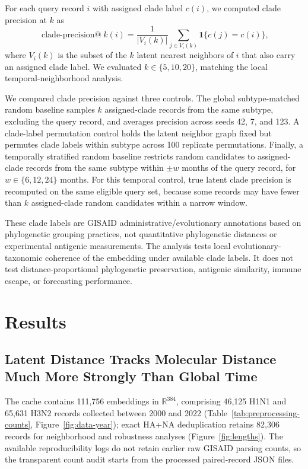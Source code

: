 \documentclass[11pt]{article}
\newcommand{\R}{\mathbb{R}}
\begin{document}
For each query record $i$ with assigned clade label $c(i)$, we computed clade precision at $k$ as
\[
\operatorname{clade\text{-}precision@}k(i)=
\frac{1}{|V_i(k)|}\sum_{j\in V_i(k)}\mathbf{1}\{c(j)=c(i)\},
\]
where $V_i(k)$ is the subset of the $k$ latent nearest neighbors of $i$ that also carry an assigned clade label. We evaluated $k\in\{5,10,20\}$, matching the local temporal-neighborhood analysis.

We compared clade precision against three controls. The global subtype-matched random baseline samples $k$ assigned-clade records from the same subtype, excluding the query record, and averages precision across seeds 42, 7, and 123. A clade-label permutation control holds the latent neighbor graph fixed but permutes clade labels within subtype across 100 replicate permutations. Finally, a temporally stratified random baseline restricts random candidates to assigned-clade records from the same subtype within $\pm w$ months of the query record, for $w\in\{6,12,24\}$ months. For this temporal control, true latent clade precision is recomputed on the same eligible query set, because some records may have fewer than $k$ assigned-clade random candidates within a narrow window.

These clade labels are GISAID administrative/evolutionary annotations based on phylogenetic grouping practices, not quantitative phylogenetic distances or experimental antigenic measurements. The analysis tests local evolutionary-taxonomic coherence of the embedding under available clade labels. It does not test distance-proportional phylogenetic preservation, antigenic similarity, immune escape, or forecasting performance.

\section{Results}

\subsection{Latent Distance Tracks Molecular Distance Much More Strongly Than Global Time}

The cache contains 111,756 embeddings in $\R^{384}$, comprising 46,125 H1N1 and 65,631 H3N2 records collected between 2000 and 2022 (Table~\ref{tab:preprocessing-counts}, Figure~\ref{fig:data-year}); exact HA+NA deduplication retains 82,306 records for neighborhood and robustness analyses (Figure~\ref{fig:lengths}). The available reproducibility logs do not retain earlier raw GISAID parsing counts, so the transparent count audit starts from the processed paired-record JSON files.
\end{document}
